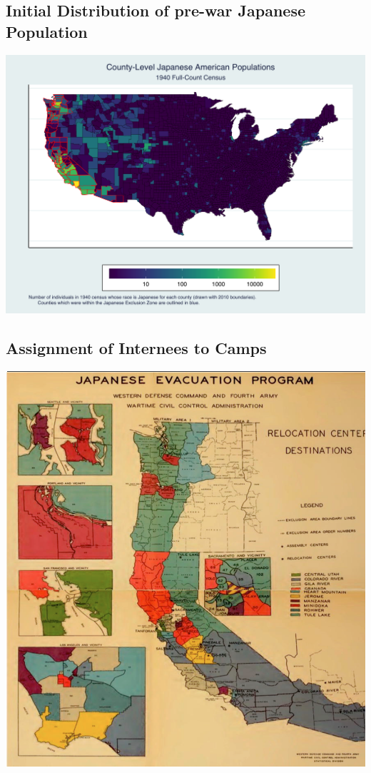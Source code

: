 \documentclass[12pt]{article}
\begin{document}
\subsection{Initial Distribution of pre-war Japanese
Population}\label{initial-distribution-of-pre-war-japanese-population}

\begin{center}
\includegraphics[width=1.0\textwidth]{figures/county_JAmap.png}
\end{center}

\subsection{Assignment of Internees to
Camps}\label{assignment-of-internees-to-camps}

\begin{center}
\includegraphics[width=.8\textwidth]{figures/WRAzonesmap.png}
\end{center}
\end{document}
